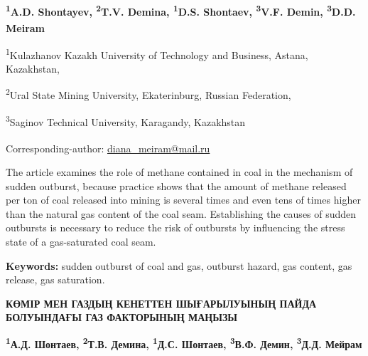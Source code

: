 \vspace{1.5em}
\begin{articleheader}

{\bfseries
\textsuperscript{1}A.D. Shontayev,
\textsuperscript{2}T.V. Demina,
\textsuperscript{1}D.S. Shontaev,
\textsuperscript{3}V.F. Demin,
\textsuperscript{3}D.D. Meiram\textsuperscript{\envelope}
}
\end{articleheader}

\begin{affiliation}
\textsuperscript{1}Kulazhanov Kazakh University of Technology and Business, Astana, Kazakhstan,

\textsuperscript{2}Ural State Mining University, Ekaterinburg, Russian Federation,

\textsuperscript{3}Saginov Technical University, Karagandy, Kazakhstan

\raggedright \textsuperscript{\envelope }Corresponding-author: \href{mailto:baiz76@mail.ru}{diana\_meiram@mail.ru}
\end{affiliation}

The article examines the role of methane contained in coal in the
mechanism of sudden outburst, because practice shows that the amount of
methane released per ton of coal released into mining is several times
and even tens of times higher than the natural gas content of the coal
seam. Establishing the causes of sudden outbursts is necessary to reduce
the risk of outbursts by influencing the stress state of a gas-saturated
coal seam.

{\bfseries Keywords:} sudden outburst of coal and gas, outburst hazard, gas
content, gas release, gas saturation.

\begin{articleheader}
{\bfseries КӨМІР МЕН ГАЗДЫҢ КЕНЕТТЕН ШЫҒАРЫЛУЫНЫҢ ПАЙДА БОЛУЫНДАҒЫ ГАЗ ФАКТОРЫНЫҢ МАҢЫЗЫ}

{\bfseries
\textsuperscript{1}А.Д. Шонтаев,
\textsuperscript{2}Т.В. Демина,
\textsuperscript{1}Д.С. Шонтаев,
\textsuperscript{3}В.Ф. Демин,
\textsuperscript{3}Д.Д. Мейрам\textsuperscript{\envelope }
}
\end{articleheader}

